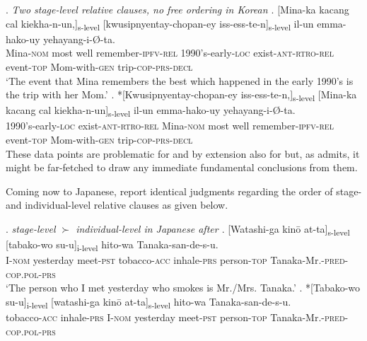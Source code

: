 \documentclass [output=book,colorlinks,citecolor=brown]{langscibook}
\begin{document}

\ex. \emph{Two stage-level relative clauses, no free ordering in Korean \citep[86]{kim:2019:syntax}} \label{s-skorean}
\ag. [Mina-ka kacang cal kiekha-n-un,]\textsubscript{s-level} [kwusipnyentay-chopan-ey iss-ess-te-n]\textsubscript{s-level} il-un emma-hako-uy yehayang-i-Ø-ta.\\
Mina-\textsc{nom} most well remember-\textsc{ipfv-rel} 1990's-early-\textsc{loc} exist-\textsc{ant-rtro-rel} event-\textsc{top} Mom-with-\textsc{gen} trip-\textsc{cop-prs-decl}\\
`The event that Mina remembers the best which happened in the early 1990's is the trip with her Mom.'
\bg. *[Kwusipnyentay-chopan-ey iss-ess-te-n,]\textsubscript{s-level} [Mina-ka kacang cal kiekha-n-un]\textsubscript{s-level} il-un emma-hako-uy yehayang-i-Ø-ta.\\
1990's-early-\textsc{loc} exist-\textsc{ant-rtro-rel} Mina-\textsc{nom} most well remember-\textsc{ipfv-rel} event-\textsc{top} Mom-with-\textsc{gen} trip-\textsc{cop-prs-decl}\\

These data points are problematic for \cite{larson:2004:order} and by extension also for \cite{cinque:2020:relcl} but, as \citet{kim:2019:syntax} admits, it might be far-fetched to draw any immediate fundamental conclusions from them. %

Coming now to Japanese, \citet[102]{larson:2004:order} report identical judgments regarding the order of stage- and individual-level relative clauses as given below.

\newpage

\ex. \label{sijapa} \emph{stage-level $\succ$ individual-level in Japanese after \citet[102]{larson:2004:order}}
\ag. [Watashi-ga kinō at-ta]\textsubscript{s-level} [tabako-wo su-u]\textsubscript{i-level} hito-wa Tanaka-san-de-s-u.\\
I-\textsc{nom} yesterday meet-\textsc{pst} tobacco-\textsc{acc} inhale-\textsc{prs} person-\textsc{top} Tanaka-Mr.-\textsc{pred-cop.pol-prs}\\
`The person who I met yesterday who smokes is Mr./Mrs. Tanaka.'
\bg. *[Tabako-wo su-u]\textsubscript{i-level} [watashi-ga kinō at-ta]\textsubscript{s-level} hito-wa Tanaka-san-de-s-u.\\
tobacco-\textsc{acc} inhale-\textsc{prs} I-\textsc{nom} yesterday meet-\textsc{pst} person-\textsc{top} Tanaka-Mr.-\textsc{pred-cop.pol-prs}\\
\end{document}
